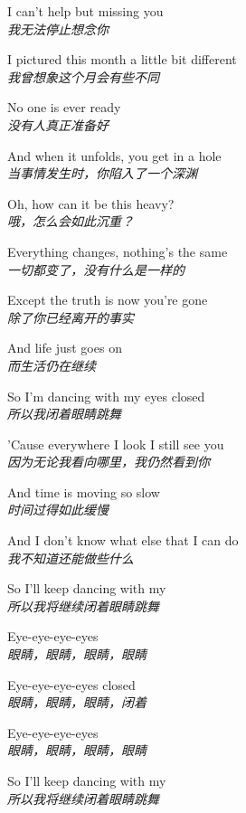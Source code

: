 \begin{spacing}{1.5}
\begin{flushleft}
I can't help but missing you\\
\textit{我无法停止想念你}\lyricspace

I pictured this month a little bit different\\
\textit{我曾想象这个月会有些不同}\lyricspace

No one is ever ready\\
\textit{没有人真正准备好}\lyricspace

And when it unfolds, you get in a hole\\
\textit{当事情发生时，你陷入了一个深渊}\lyricspace

Oh, how can it be this heavy?\\
\textit{哦，怎么会如此沉重？}\lyricspace

Everything changes, nothing's the same\\
\textit{一切都变了，没有什么是一样的}\lyricspace

Except the truth is now you're gone\\
\textit{除了你已经离开的事实}\lyricspace

And life just goes on\\
\textit{而生活仍在继续}\lyricspace

So I'm dancing with my eyes closed\\
\textit{所以我闭着眼睛跳舞}\lyricspace

'Cause everywhere I look I still see you\\
\textit{因为无论我看向哪里，我仍然看到你}\lyricspace

And time is moving so slow\\
\textit{时间过得如此缓慢}\lyricspace

And I don't know what else that I can do\\
\textit{我不知道还能做些什么}\lyricspace

So I'll keep dancing with my\\
\textit{所以我将继续闭着眼睛跳舞}\lyricspace

Eye-eye-eye-eyes\\
\textit{眼睛，眼睛，眼睛，眼睛}\lyricspace

Eye-eye-eye-eyes closed\\
\textit{眼睛，眼睛，眼睛，闭着}\lyricspace

Eye-eye-eye-eyes\\
\textit{眼睛，眼睛，眼睛，眼睛}\lyricspace

So I'll keep dancing with my\\
\textit{所以我将继续闭着眼睛跳舞}\lyricspace


\end{flushleft}
\end{spacing}
